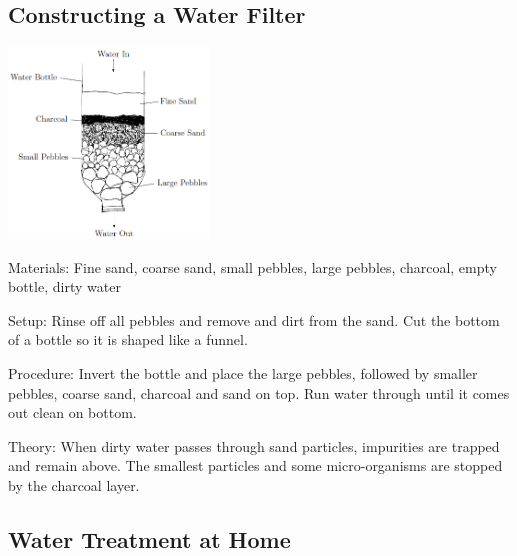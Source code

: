 \begin{multicols}{2}
\columnbreak

\subsection{Constructing a Water Filter}

\begin{center}
\includegraphics[width=0.4\textwidth]{./img/water-filter.png}
\end{center}

\begin{description*}
\item[Materials:]{Fine sand, coarse sand, small pebbles, large pebbles, charcoal, empty bottle, dirty water}
\item[Setup:]{Rinse off all pebbles and remove and dirt from the sand. Cut the bottom of a bottle so it is shaped like a funnel.}
\item[Procedure:]{Invert the bottle and place the large pebbles, followed by smaller pebbles, coarse sand, charcoal and sand on top. Run water through until it comes out clean on bottom.}
\item[Theory:]{When dirty water passes through sand particles, impurities are trapped and
remain above. The smallest particles and some micro-organisms are stopped
by the charcoal layer.}
\end{description*}


\subsection{Water Treatment at Home}


\end{multicols}
